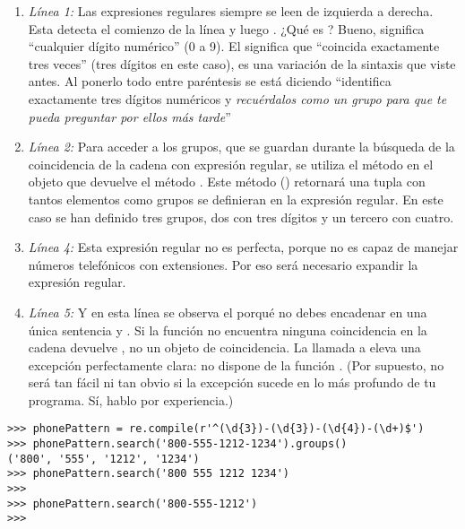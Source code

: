 \begin{enumerate}

\item \emph{Línea 1:} Las expresiones regulares siempre se leen de izquierda a derecha. Esta detecta el comienzo de la línea y luego . ¿Qué es ? Bueno,  significa ``cualquier dígito numérico'' (0 a 9). El  significa que ``coincida exactamente tres veces'' (tres dígitos en este caso), es una variación de la sintaxis  que viste antes. Al ponerlo todo entre paréntesis se está diciendo ``identifica exactamente tres dígitos numéricos y \emph{recuérdalos como un grupo para que te pueda preguntar por ellos más tarde}''

\item \emph{Línea 2:} Para acceder a los grupos, que se guardan durante la búsqueda de la coincidencia de la cadena con expresión regular, se utiliza el método  en el objeto que devuelve el método . Este método () retornará una tupla con tantos elementos como grupos se definieran en la expresión regular. En este caso se han definido tres grupos, dos con tres dígitos y un tercero con cuatro.

\item \emph{Línea 4:} Esta expresión regular no es perfecta, porque no es capaz de manejar números telefónicos con extensiones. Por eso será necesario expandir la expresión regular.
 
\item \emph{Línea 5:} Y en esta línea se observa el porqué no debes encadenar en una única sentencia  y . Si la función  no encuentra ninguna coincidencia en la cadena devuelve , no un objeto de coincidencia. La llamada a  eleva una excepción perfectamente clara:  no dispone de la función . (Por supuesto, no será tan fácil ni tan obvio si la excepción sucede en lo más profundo de tu programa. Sí, hablo por experiencia.)

\end{enumerate}

\noindent\begin{minipage}{\textwidth}
\begin{lstlisting}[mathescape=False]
>>> phonePattern = re.compile(r'^(\d{3})-(\d{3})-(\d{4})-(\d+)$')
>>> phonePattern.search('800-555-1212-1234').groups()
('800', '555', '1212', '1234')
>>> phonePattern.search('800 555 1212 1234')
>>> 
>>> phonePattern.search('800-555-1212')
>>> 
\end{lstlisting}
\end{minipage}

